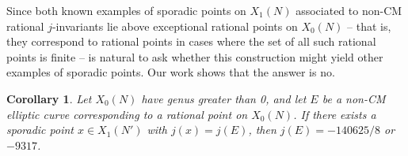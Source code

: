 \documentclass[11pt,reqno]{amsart}
\theoremstyle{plain}
\newtheorem{corollary}[theorem]{Corollary}
\theoremstyle{definition}
\begin{document}
Since both known examples of sporadic points on $X_1(N)$ associated to non-CM rational $j$-invariants lie above exceptional rational points on $X_0(N)$ -- that is, they correspond to rational points in cases where the set of all such rational points is finite -- is natural to ask whether this construction might yield other examples of sporadic points. Our work shows that the answer is no.
\begin{corollary}
Let $X_0(N)$ have genus greater than 0, and let $E$ be a non-CM elliptic curve corresponding to a rational point on $X_0(N)$. If there exists a sporadic point $x \in X_1(N')$ with $j(x)=j(E)$, then $j(E) =-140625/8$ or $-9317$.
\end{corollary}




\vspace{20 mm}


\end{document}
